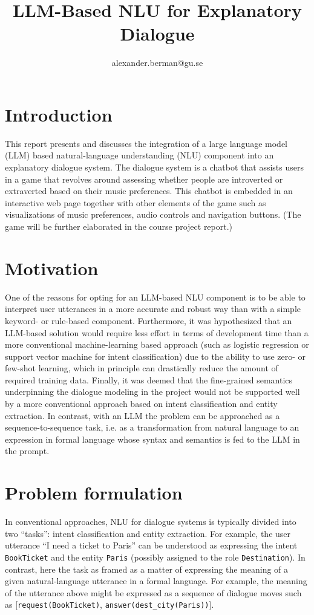 \documentclass[11pt]{article}
\title{LLM-Based NLU for Explanatory Dialogue}
\author{alexander.berman@gu.se}
\begin{document}
\maketitle

\section{Introduction}
This report presents and discusses the integration of a large language model (LLM) based natural-language understanding (NLU) component into an explanatory dialogue system. The dialogue system is a chatbot that assists users in a game that revolves around assessing whether people are introverted or extraverted based on their music preferences. This chatbot is embedded in an interactive web page together with other elements of the game such as visualizations of music preferences, audio controls and navigation buttons. (The game will be further elaborated in the course project report.)

\section{Motivation}
One of the reasons for opting for an LLM-based NLU component is to be able to interpret user utterances in a more accurate and robust way than with a simple keyword- or rule-based component. Furthermore, it was hypothesized that an LLM-based solution would require less effort in terms of development time than a more conventional machine-learning based approach (such as logistic regression or support vector machine for intent classification) due to the ability to use zero- or few-shot learning, which in principle can drastically reduce the amount of required training data. Finally, it was deemed that the fine-grained semantics underpinning the dialogue modeling in the project would not be supported well by a more conventional approach based on intent classification and entity extraction. In contrast, with an LLM the problem can be approached as a sequence-to-sequence task, i.e. as a transformation from natural language to an expression in formal language whose syntax and semantics is fed to the LLM in the prompt.

\section{Problem formulation}
In conventional approaches, NLU for dialogue systems is typically divided into two ``tasks'': intent classification and entity extraction. For example, the user utterance ``I need a ticket to Paris'' can be understood as expressing the intent \texttt{BookTicket} and the entity \texttt{Paris} (possibly assigned to the role \texttt{Destination}). In contrast, here the task as framed as a matter of expressing the meaning of a given natural-language utterance in a formal language. For example, the meaning of the utterance above might be expressed as a sequence of dialogue moves such as [\texttt{request(BookTicket)}, \texttt{answer(dest\_city(Paris))}].
\end{document}
